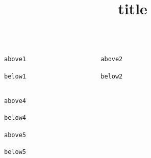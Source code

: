 \documentclass{ltx-talk}
\title{title}
\begin{document}
\begin{frame*}
\lstset{aboveskip=0pt,belowskip=0pt}
\begin{columns}
\begin{column}{.3\textwidth}
\begin{lstlisting}
above1
\end{lstlisting}
\begin{lstlisting}
below1
\end{lstlisting}
\end{column}
\begin{column}{.3\textwidth}
\begin{minipage}{\linewidth}
\begin{lstlisting}
above2
\end{lstlisting}
\begin{lstlisting}
below2
\end{lstlisting}
\end{minipage}
\end{column}
\begin{column}{.3\textwidth}\end{column}%
\end{columns}
\begin{minipage}{.3\textwidth}
\begin{lstlisting}
above4
\end{lstlisting}
\begin{lstlisting}
below4
\end{lstlisting}
\end{minipage}
%
\begin{lstlisting}
above5
\end{lstlisting}
\begin{lstlisting}
below5
\end{lstlisting}
\end{frame*}
\end{document}
